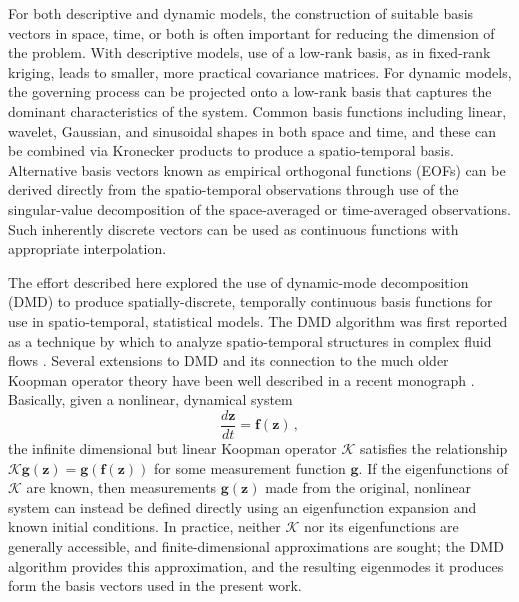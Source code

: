 \documentclass[review,number,sort&compress,12pt]{elsarticle}
\begin{document}
For both descriptive and dynamic models, the construction of suitable basis vectors in space, time, or both is often important for reducing the dimension of the problem.
With descriptive models, use of a low-rank basis, as in fixed-rank kriging, leads to smaller, more practical covariance matrices.
For dynamic models, the governing process can be projected onto a low-rank basis that captures the dominant characteristics of the system.
Common basis functions including linear, wavelet, Gaussian, and sinusoidal shapes in both space and time, and these can be combined via Kronecker products to produce a spatio-temporal basis.
Alternative basis vectors known as empirical orthogonal functions (EOFs) can be derived directly from the spatio-temporal observations through use of the singular-value decomposition of the space-averaged or time-averaged observations.
Such inherently discrete vectors can be used as continuous functions with appropriate interpolation.

The effort described here explored the use of dynamic-mode decomposition (DMD) \cite{schmid:hal-01053394} to produce spatially-discrete, temporally continuous basis functions for use in spatio-temporal, statistical models.
The DMD algorithm was first reported as a technique by which to analyze spatio-temporal structures in complex fluid flows \cite{schmid:hal-01053394, schmid2010dynamic}.
Several extensions to DMD and its connection to the much older Koopman operator theory have been well described in a recent monograph \cite{kutzbook}.  
Basically, given a nonlinear, dynamical system
\begin{equation}
  \frac{d\mathbf{z}}{dt} = \mathbf{f}(\mathbf{z}) \, ,
  \label{eq:dynamicalsystem}
\end{equation}
the infinite dimensional but linear Koopman operator $\mathcal{K}$ satisfies the relationship $\mathcal{K}\mathbf{g}(\mathbf{z}) = \mathbf{g}(\mathbf{f}(\mathbf{z}))$ for some measurement function $\mathbf{g}$.
If the eigenfunctions of $\mathcal{K}$ are known, then measurements $\mathbf{g}(\mathbf{z})$ made from the original, nonlinear system can instead be defined directly using an eigenfunction expansion and known initial conditions.
In practice, neither $\mathcal{K}$ nor its eigenfunctions are generally accessible, and finite-dimensional approximations are sought; the DMD algorithm provides this approximation, and the resulting eigenmodes it produces form the basis vectors used in the present work.
\end{document}
